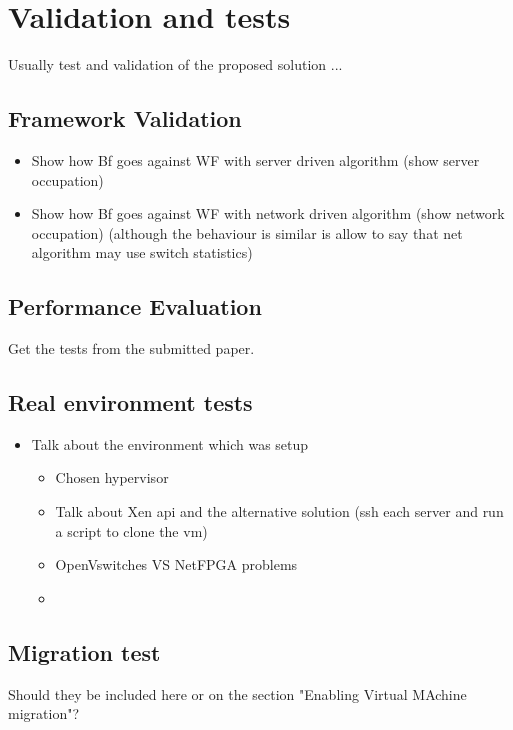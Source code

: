 \documentclass[12pt,english]{book}
\begin{document}
\chapter{Validation and tests \label{cha:valtes} }

Usually test and validation of the proposed solution ...

\section{Framework Validation}

\begin{itemize}
	\item Show how Bf goes against WF with server driven algorithm (show server occupation)
	\item Show how Bf goes against WF with network driven algorithm (show network occupation) (although the behaviour is similar is allow to say that net algorithm may use switch statistics)
\end{itemize}
\newpage


\section{Performance Evaluation}

Get the tests from the submitted paper.
\newpage

\section{Real environment tests}
\begin{itemize}
	\item Talk about the environment which was setup
	\begin{itemize}
		\item Chosen hypervisor
		\item Talk about Xen api and the alternative solution (ssh each server and run a script to clone the vm)
		\item OpenVswitches VS NetFPGA problems
		\item 
	\end{itemize}
\end{itemize}
\newpage


\section{Migration test}

Should they be included here or on the section "Enabling Virtual MAchine migration"?
\newpage
\end{document}
